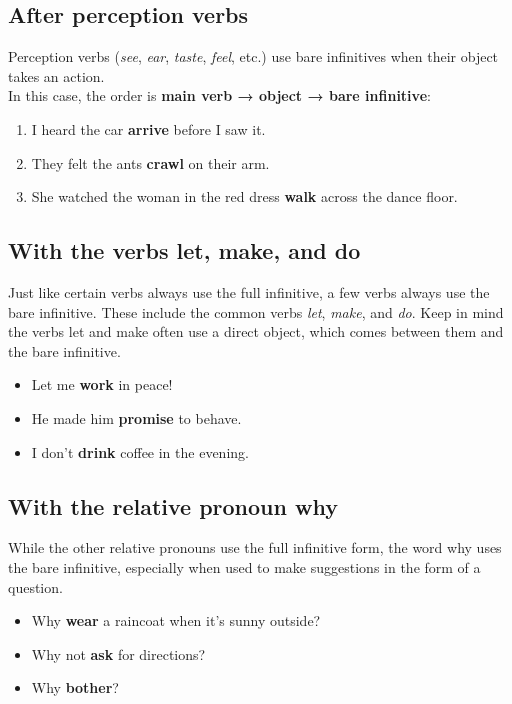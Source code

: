 \subsection{After perception verbs}

Perception verbs (\textit{see}, \textit{ear}, \textit{taste}, \textit{feel}, etc.) 
use bare infinitives when their object takes an action. \\
In this case, the order is \textbf{main verb → object → bare infinitive}:
\begin{enumerate}
    \item[] I heard the car \textbf{arrive} before I saw it. 
    \item[] They felt the ants \textbf{crawl} on their arm. 
    \item[] She watched the woman in the red dress \textbf{walk} across the dance floor. 
\end{enumerate}






\subsection{With the verbs let, make, and do}
Just like certain verbs always use the full infinitive, 
a few verbs always use the bare infinitive. 
These include the common verbs \textit{let}, \textit{make}, and \textit{do}. 
Keep in mind the verbs let and make often use a direct object, 
which comes between them and the bare infinitive. 
\begin{itemize}
    \item[] Let me \textbf{work} in peace!
    \item[] He made him \textbf{promise} to behave. 
    \item[] I don’t \textbf{drink} coffee in the evening. 
\end{itemize}



\subsection{With the relative pronoun why}
While the other relative pronouns use the full infinitive form, 
the word why uses the bare infinitive, especially when used to make suggestions in the form of a question. 
\begin{itemize}
    \item[] Why \textbf{wear} a raincoat when it’s sunny outside? 
    \item[] Why not \textbf{ask} for directions? 
    \item[] Why \textbf{bother}?
\end{itemize}